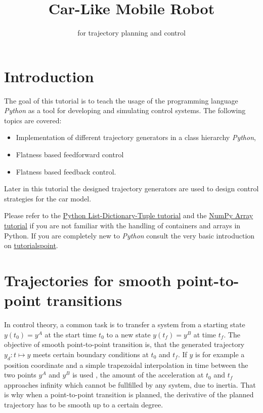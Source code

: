 \documentclass[a4paper,11pt,headings=standardclasses,parskip=half]{scrartcl}
\title{Car-Like Mobile Robot}
\subtitle{\py for trajectory planning and control}%
\author{}
\date{}
\newcommand{\py}{\emph{Python}\xspace}
\begin{document}
\maketitle%

\tableofcontents

\newpage

\section{Introduction}
The goal of this tutorial is to teach the usage of the programming language \py as a tool for developing and simulating control systems. The following topics are covered:
\begin{itemize}
\item Implementation of different trajectory generators in a class hierarchy \py,
\item Flatness based feedforward control
\item Flatness based feedback control.
\end{itemize}

Later in this tutorial the designed trajectory generators are used to design control strategies for the car model. 

Please refer to the \href{http://cs231n.github.io/python-numpy-tutorial/#python-containers}{Python List-Dictionary-Tuple tutorial} and the \href{http://cs231n.github.io/python-numpy-tutorial/#numpy}{NumPy Array tutorial} if you are not familiar with the handling of containers and arrays in Python. If you are completely new to \py consult the very basic introduction on \href{https://www.tutorialspoint.com/python/index.htm}{tutorialspoint}.
\section{Trajectories for smooth point-to-point transitions}
In control theory, a common task is to transfer a system from a starting state $y(t_0)=y^A$ at the start time $t_0$ to a new state $y(t_f)=y^B$ at time $t_f$. The objective of smooth point-to-point transition is, that the generated trajectory $y_d: t \mapsto y$ meets certain boundary conditions at $t_0$ and $t_f$. If $y$ is for example a position coordinate and a simple trapezoidal interpolation in time between the two points $y^A$ and $y^B$ is used , the amount of the acceleration at $t_0$ and $t_f$ approaches infinity which cannot be fullfilled by any system, due to inertia. That is why when a point-to-point transition is planned, the derivative of the planned trajectory has to be smooth up to a certain degree. 
\end{document}
